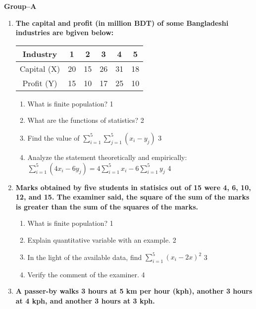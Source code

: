 \documentclass{article}
\begin{document}
  \begin{center}
  \textbf{Group--A}
  \end{center}
    \begin{enumerate}
    
       \item
	  \textbf{The capital and profit (in million BDT) of some Bangladeshi industries are bgiven below:}
	  
	  \begin{table}[h]
	  \centering
\begin{tabular}{c|ccccc}
Industry & 1 & 2 & 3 & 4 & 5 \\ \hline
Capital (X) & 20 & 15 & 26 & 31 & 18 \\ \hline
Profit (Y) & 15 & 10 & 17 & 25 & 10
\end{tabular}
\end{table}
  
  \begin{enumerate}
    \item
	What is finite population? \hfill 1
    \item
	What are the functions of statistics? \hfill 2
    \item  
	Find the value of $\displaystyle \sum_{i=1}^5 \sum_{j=1}^5 (x_i - y_j)$ \hfill 3
    \item
	Analyze the statement theoretically and empirically:  $\displaystyle \sum_{i=1}^5 (4x_i-6y_j) = 4 \sum_{i=1}^5 x_i - 6 \sum_{i=1}^5 y_j $ \hfill 4
  \end{enumerate}
  
  
 \item
	  \textbf{Marks obtained by five students in statisics out of 15 were 4, 6, 10, 12, and 15. The examiner said, the square of the sum of the marks is greater than the sum of the squares of the marks.} 
  
  \begin{enumerate}
    \item
	What is finite population? \hfill 1
    \item
	Explain quantitative variable with an example. \hfill 2
    \item  
	In the light of the available data, find $\displaystyle \sum_{i=1}^5 (x_i-2x)^2$ \hfill 3
    \item
	Verify the comment of the examiner. \hfill 4
  \end{enumerate}
  
     \item
	  \textbf{A passer-by walks 3 hours at 5 km per hour (kph), another 3 hours at 4 kph, and another 3 hours at 3 kph.} 
  

\end{enumerate}
\end{document}
